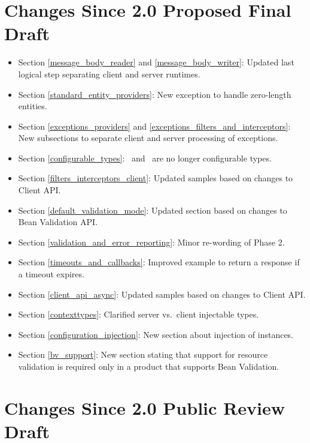\section{Changes Since 2.0 Proposed Final Draft}

\begin{itemize}
\item Section \ref{message_body_reader} and \ref{message_body_writer}: Updated last logical step separating client and server runtimes.
\item Section \ref{standard_entity_providers}: New exception  to handle zero-length entities. 
\item Section \ref{exceptions_providers} and \ref{exceptions_filters_and_interceptors}: New subsections to separate client and server processing of exceptions.
\item Section \ref{configurable_types}: \Invocation\ and \InvocationBuilder\ are no longer configurable types.
\item Section \ref{filters_interceptors_client}: Updated samples based on changes to Client API.
\item Section \ref{default_validation_mode}: Updated section based on changes to Bean Validation API.
\item Section \ref{validation_and_error_reporting}: Minor re-wording of Phase 2. 
\item Section \ref{timeouts_and_callbacks}: Improved example to return a response if a timeout expires.
\item Section \ref{client_api_async}: Updated samples based on changes to Client API.
\item Section \ref{contexttypes}: Clarified server vs.~client injectable types.
\item Section \ref{configuration_injection}: New section about injection of  instances.
\item Section \ref{bv_support}: New section stating that support for resource validation is required only in a product that supports Bean Validation.
\end{itemize}

\section{Changes Since 2.0 Public Review Draft}

